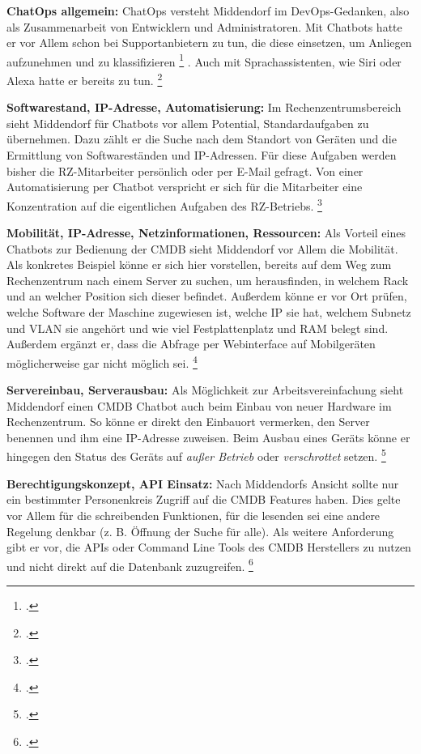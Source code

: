 \textbf{ChatOps allgemein: }ChatOps versteht Middendorf im DevOps-Gedanken, also als Zusammenarbeit von Entwicklern und Administratoren.
Mit Chatbots hatte er vor Allem schon bei Supportanbietern zu tun, die diese einsetzen, um \glqq{}Anliegen aufzunehmen und zu klassifizieren\grqq
\footcite[][o. \pno]{Midd_2019}
.
Auch mit Sprachassistenten, wie Siri oder Alexa hatte er bereits zu tun.
\footcite[Vgl.][o. \pno]{Midd_2019}

\textbf{Softwarestand, IP-Adresse, Automatisierung: }Im Rechenzentrumsbereich sieht Middendorf für Chatbots vor allem Potential, Standardaufgaben zu übernehmen. Dazu zählt er die Suche nach dem Standort von Geräten und die Ermittlung von Softwareständen und IP-Adressen. Für diese Aufgaben werden bisher die RZ-Mitarbeiter persönlich oder per E-Mail gefragt. Von einer Automatisierung per Chatbot verspricht er sich für die Mitarbeiter eine Konzentration auf die eigentlichen Aufgaben des RZ-Betriebs.
\footcite[Vgl.][o. \pno]{Midd_2019}

\textbf{Mobilität, IP-Adresse, Netzinformationen, Ressourcen: }Als Vorteil eines Chatbots zur Bedienung der \acs{CMDB} sieht Middendorf vor Allem die Mobilität. Als konkretes Beispiel könne er sich hier vorstellen, bereits auf dem Weg zum Rechenzentrum nach einem Server zu suchen, um herausfinden, in welchem Rack und an welcher Position sich dieser befindet. Außerdem könne er vor Ort prüfen, welche Software der Maschine zugewiesen ist, welche IP sie hat, welchem Subnetz und VLAN sie angehört und wie viel Festplattenplatz und RAM belegt sind.
Außerdem ergänzt er, dass die Abfrage per Webinterface auf Mobilgeräten möglicherweise gar nicht möglich sei.
\footcite[Vgl.][o. \pno]{Midd_2019}

\textbf{Servereinbau, Serverausbau: }Als Möglichkeit zur Arbeitsvereinfachung sieht Middendorf einen \acs{CMDB} Chatbot auch beim Einbau von neuer Hardware im Rechenzentrum. So könne er direkt den Einbauort vermerken, den Server benennen und ihm eine IP-Adresse zuweisen. Beim Ausbau eines Geräts könne er hingegen den Status des Geräts auf \textit{außer Betrieb} oder \textit{verschrottet} setzen.
\footcite[Vgl.][o. \pno]{Midd_2019}

\textbf{Berechtigungskonzept, API Einsatz: }Nach Middendorfs Ansicht sollte nur ein bestimmter Personenkreis Zugriff auf die \acs{CMDB} Features haben. Dies gelte vor Allem für die schreibenden Funktionen, für die lesenden sei eine andere Regelung denkbar (z. B. Öffnung der Suche für alle).
Als weitere Anforderung gibt er vor, die \acsp{API} oder Command Line Tools des \acs{CMDB} Herstellers zu nutzen und nicht direkt auf die Datenbank zuzugreifen.
\footcite[Vgl.][o. \pno]{Midd_2019}

